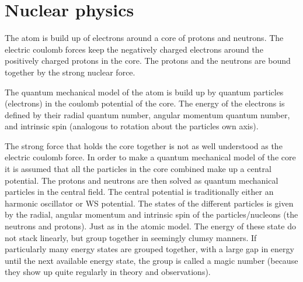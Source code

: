 \section{Nuclear physics}

The atom is build up of electrons around a core of protons and neutrons.
The electric coulomb forces keep the negatively charged electrons around the positively charged
protons in the core. The protons and the neutrons are bound together by the strong nuclear force.

The quantum mechanical model of the atom is build up by quantum particles (electrons)
in the coulomb potential of the core. The energy of the electrons is defined by their
radial quantum number, angular momentum quantum number, and intrinsic spin (analogous to
rotation about the particles own axis).

The strong force that holds the core together is not as well understood as the electric coulomb
force. In order to make a quantum mechanical model of the core it is assumed that all the
particles in the core combined make up a central potential. The protons and neutrons are
then solved as quantum mechanical particles in the central field.
The central potential is traditionally either an harmonic oscillator or WS potential.
The states of the different particles is given by the radial, angular momentum and intrinsic
spin of the particles/nucleons (the neutrons and protons). Just as in the atomic model.
The energy of these state do not stack linearly, but group together in seemingly clumsy manners.
If particularly many energy states are grouped together, with a large gap in energy until the next
available energy state, the group is called a magic number (because they show up quite regularly in theory
and observations).


